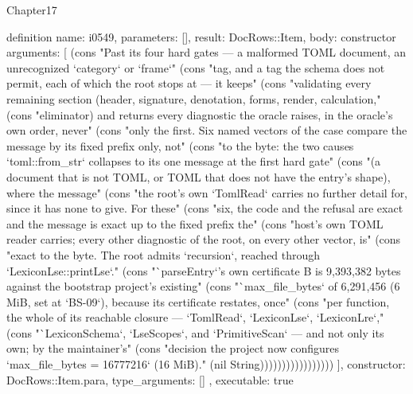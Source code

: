 \begin{lexlean}{Chapter17}
\begin{semanticmodule}
definition{
  name: i0549,
  parameters: [],
  result: DocRows::Item,
  body: constructor{
    arguments: [
      (cons "Past its four hard gates — a malformed TOML document, an unrecognized `category` or `frame`" (cons "tag, and a tag the schema does not permit, each of which the root stops at — it keeps" (cons "validating every remaining section (header, signature, denotation, forms, render, calculation," (cons "eliminator) and returns every diagnostic the oracle raises, in the oracle's own order, never" (cons "only the first. Six named vectors of the case compare the message by its fixed prefix only, not" (cons "to the byte: the two causes `toml::from_str` collapses to its one message at the first hard gate" (cons "(a document that is not TOML, or TOML that does not have the entry's shape), where the message" (cons "the root's own `TomlRead` carries no further detail for, since it has none to give. For these" (cons "six, the code and the refusal are exact and the message is exact up to the fixed prefix the" (cons "host's own TOML reader carries; every other diagnostic of the root, on every other vector, is" (cons "exact to the byte. The root admits `recursion`, reached through `LexiconLse::printLse`." (cons "`parseEntry`'s own certificate B is 9,393,382 bytes against the bootstrap project's existing" (cons "`max_file_bytes` of 6,291,456 (6 MiB, set at `BS-09`), because its certificate restates, once" (cons "per function, the whole of its reachable closure — `TomlRead`, `LexiconLse`, `LexiconLre`," (cons "`LexiconSchema`, `LseScopes`, and `PrimitiveScan` — and not only its own; by the maintainer's" (cons "decision the project now configures `max_file_bytes = 16777216` (16 MiB)." (nil String)))))))))))))))))
    ],
    constructor: DocRows::Item.para,
    type_arguments: []
  },
  executable: true
}
\end{semanticmodule}
\end{lexlean}
